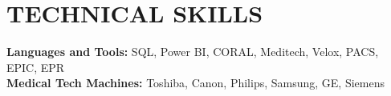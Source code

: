 
\section{\textcolor{airforceblue}{TECHNICAL SKILLS}}
 \begin{itemize}[leftmargin=0in, label={}]
    \small{\item{
     \textbf{Languages and Tools:}{ SQL, Power BI, CORAL, Meditech, Velox, PACS, EPIC, EPR} \\
      \vspace{1.2pt}
     \textbf{Medical Tech Machines:}{ Toshiba, Canon, Philips, Samsung, GE, Siemens} \\
      \vspace{1.2pt}
     }}
 \end{itemize}
 \vspace{-10pt}
